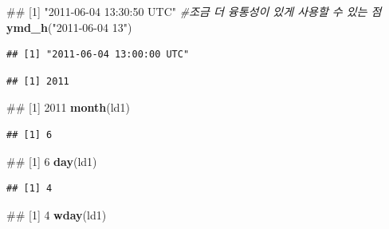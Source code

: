 \documentclass[10pt,]{krantz}
\makeatletter
\newenvironment{Shaded}{\begin{snugshade}}{\end{snugshade}}
\newcommand{\KeywordTok}[1]{\textcolor[rgb]{0.13,0.29,0.53}{\textbf{#1}}}
\newcommand{\StringTok}[1]{\textcolor[rgb]{0.31,0.60,0.02}{#1}}
\newcommand{\CommentTok}[1]{\textcolor[rgb]{0.56,0.35,0.01}{\textit{#1}}}
\newcommand{\NormalTok}[1]{#1}
\newenvironment{kframe}{%
\medskip{}
\setlength{\fboxsep}{.8em}
 \def\at@end@of@kframe{}%
 \ifinner\ifhmode%
  \def\at@end@of@kframe{\end{minipage}}%
  \begin{minipage}{\columnwidth}%
 \fi\fi%
 \def\FrameCommand##1{\hskip\@totalleftmargin \hskip-\fboxsep
 \colorbox{shadecolor}{##1}\hskip-\fboxsep
     \hskip-\linewidth \hskip-\@totalleftmargin \hskip\columnwidth}%
 \MakeFramed {\advance\hsize-\width
   \@totalleftmargin\z@ \linewidth\hsize
   \@setminipage}}%
 {\par\unskip\endMakeFramed%
 \at@end@of@kframe}
\renewenvironment{Shaded}{\begin{kframe}}{\end{kframe}}
\makeatother
\begin{document}
\begin{Shaded}
\begin{Highlighting}[]
\NormalTok{## [1] "2011-06-04 13:30:50 UTC"}
\CommentTok{#조금 더 융통성이 있게 사용할 수 있는 점}
\KeywordTok{ymd_h}\NormalTok{(}\StringTok{"2011-06-04 13"}\NormalTok{)}
\end{Highlighting}
\end{Shaded}

\begin{verbatim}
## [1] "2011-06-04 13:00:00 UTC"
\end{verbatim}

\begin{Shaded}
\end{Shaded}

\begin{verbatim}
## [1] 2011
\end{verbatim}

\begin{Shaded}
\begin{Highlighting}[]
\NormalTok{## [1] 2011}
\KeywordTok{month}\NormalTok{(ld1)}
\end{Highlighting}
\end{Shaded}

\begin{verbatim}
## [1] 6
\end{verbatim}

\begin{Shaded}
\begin{Highlighting}[]
\NormalTok{## [1] 6}
\KeywordTok{day}\NormalTok{(ld1)}
\end{Highlighting}
\end{Shaded}

\begin{verbatim}
## [1] 4
\end{verbatim}

\begin{Shaded}
\begin{Highlighting}[]
\NormalTok{## [1] 4}
\KeywordTok{wday}\NormalTok{(ld1)}
\end{Highlighting}
\end{Shaded}
\end{document}
